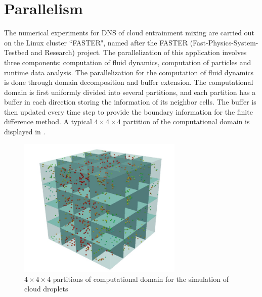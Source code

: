 \section{Parallelism}
The numerical experiments for DNS of cloud entrainment mixing are carried out on the Linux cluster ``FASTER", named after the FASTER (Fast-Physics-System-Testbed and Research) project. The parallelization of this application involves three components: computation of fluid dynamics, computation of particles and runtime data analysis. The parallelization for the computation of fluid dynamics is done through domain decomposition and buffer extension. The computational domain is first uniformly divided into several partitions, and each partition has a buffer in each direction storing the information of its neighbor cells. The buffer is then updated every time step to provide the boundary information for the finite difference method. A typical $4\times 4\times 4$ partition of the computational domain is displayed in . 

\begin{figure}[!htbp] \centering
\includegraphics[width=0.7\textwidth]{Figures/droplets_parallel.jpg}
\caption{$4\times 4\times 4$ partitions of computational domain for the simulation of 
cloud droplets\label{fig:droplets_parallel}} 
\end{figure}

